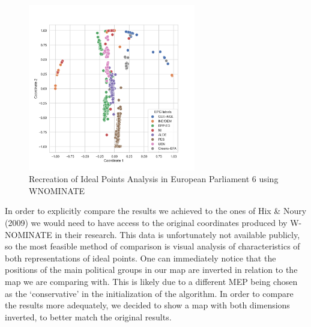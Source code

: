 \documentclass[a4paper,12pt]{report}
\begin{document}
                \begin{figure}[H]
                    \centering
                    \includegraphics[width=0.65\textwidth]{Graphs/WNOMINATE2d}
                    \caption{Recreation of Ideal Points Analysis in European Parliament 6 using WNOMINATE}
                    \label{fig:WNOMINATE 6}
                \end{figure}



                In order to explicitly compare the results we achieved to the ones of Hix \& Noury (2009) we would need
                to have
                access to the original coordinates produced by W-NOMINATE in their research. This data is
                unfortunately not available publicly, so the most feasible method of comparison is visual analysis
                of characteristics of both representations of ideal points. One can immediately notice that the
                positions of the main political groups in our map are inverted in relation to the map we are
                comparing with. This is likely due to a different MEP being chosen as the `conservative' in the
                initialization of the algorithm. In order to compare the results more adequately, we decided to show
                a map with both dimensions inverted, to better match the original results.
\end{document}
